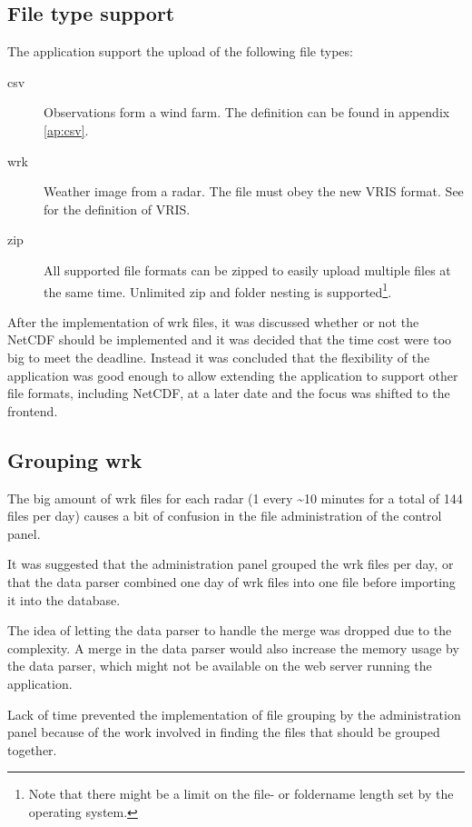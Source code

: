 \subsection{File type support}
The application support the upload of the following file types:
\begin{description}
\item[csv] Observations form a wind farm. The definition can be found in appendix \ref{ap:csv}.
\item[wrk] Weather image from a radar. The file must obey the new VRIS format. See \cite{VRIS} for the definition of VRIS.
\item[zip] All supported file formats can be zipped to easily upload multiple files at the same time. Unlimited zip and folder nesting is supported\footnote{Note that there might be a limit on the file- or foldername length set by the operating system.}.
\end{description}
After the implementation of wrk files, it was discussed whether or not the NetCDF should be implemented and it was decided that the time cost were too big to meet the deadline. Instead it was concluded that the flexibility of the application was good enough to allow extending the application to support other file formats, including NetCDF, at a later date and the focus was shifted to the frontend.

\subsection{Grouping wrk}
The big amount of wrk files for each radar (1 every \textasciitilde 10 minutes for a total of 144 files per day) causes a bit of confusion in the file administration of the control panel.

It was suggested that the administration panel grouped the wrk files per day, or that the data parser combined one day of wrk files into one file before importing it into the database.

The idea of letting the data parser to handle the merge was dropped due to the complexity. A merge in the data parser would also increase the memory usage by the data parser, which might not be available on the web server running the application.

Lack of time prevented the implementation of file grouping by the administration panel because of the work involved in finding the files that should be grouped together.

